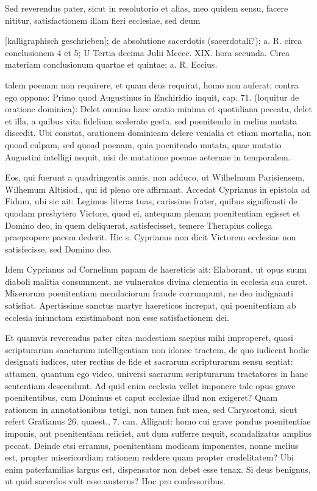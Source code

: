 \marginpar{\small[374]} Sed reverendus pater, sicut in resolutorio et alias, meo quidem sensu, facere nititur, satisfactionem illam fieri ecclesiae, sed deum

[kalligraphisch geschrieben]; de absolutione sacerdotis (sacerdotali?); a. R. circa conclusionem 4 et 5; U Tertia decima Julii Mcccc. XIX. hora secunda. Circa materiam conclusionum quartae et quintae; a. R. Eccius.

talem poenam non requirere, et quam deus requirat, homo non auferat; contra ego oppono: Primo quod Augustinus in Enchiridio inquit, cap. 71. (loquitur de oratione dominica): Delet omnino haec oratio minima et quotidiana peccata, delet et illa, a quibus vita fidelium scelerate gesta, sed poenitendo in melius mutata discedit. Ubi constat, orationem dominicam delere venialia et etiam mortalia, non quoad culpam, sed quoad poenam, quia poenitendo mutata, quae mutatio Augustini intelligi nequit, nisi de mutatione poenae aeternae in temporalem.

Eos, qui fuerunt a quadringentis annis, non adduco, ut Wilhelmum Parisiensem, Wilhemum Altisiod., qui id pleno ore affirmant. Accedat Cyprianus in epistola ad Fidum, ubi sic ait: Legimus literas tuas, carissime frater, quibus significasti de quodam presbytero Victore, quod ei, antequam plenam poenitentiam egisset et Domino deo, in quem deliquerat, satisfecisset, temere Therapius collega praepropere pacem dederit. Hic s. Cyprianus non dicit Victorem ecclesiae non satisfecisse, sed Domino deo.

Idem Cyprianus ad Cornelium papam de haereticis ait: Elaborant, ut opus suum diaboli malitia consumment, ne vulneratos divina clementia in ecclesia sua curet. Miserorum poenitentiam mendaciorum fraude corrumpunt, ne deo indignanti satisfiat. Apertissime sanctus martyr haereticos increpat, qui poenitentiam ab ecclesia iniunctam existimabant non esse satisfactionem dei.

Et quamvis reverendus pater citra modestiam saepius mihi improperet, quasi scripturarum sanctarum intelligentiam non idonee tractem, de quo iudicent hodie designati iudices, uter rectius de fide et sacrarum scripturarum sensu sentiat: attamen, quantum ego video, universi sacrarum scripturarum tractatores in hanc sententiam descendunt. Ad quid enim ecclesia vellet imponere tale opus grave poenitentibus, cum Dominus et caput ecclesiae illud non exigeret? Quam rationem in annotationibus tetigi, non tamen fuit mea, sed Chrysostomi, sicut refert Gratianus 26. quaest., 7. can. Alligant: homo cui grave pondus poenitentiae imponis, aut poenitentiam reiiciet, aut dum sufferre nequit, scandalizatus amplius peccat. Deinde etsi erramus, poenitentiam modicam imponentes, nonne melius est, propter misericordiam rationem reddere quam propter crudelitatem? Ubi enim paterfamilias largus est, dispensator non debet esse tenax. Si deus benignus, ut quid sacerdos vult esse austerus? Hoc pro confessoribus.

